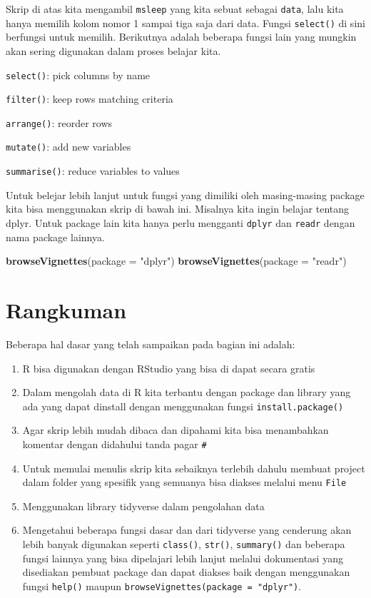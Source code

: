 \documentclass[]{book}
\newenvironment{Shaded}{\begin{snugshade}}{\end{snugshade}}
\newcommand{\DataTypeTok}[1]{\textcolor[rgb]{0.13,0.29,0.53}{#1}}
\newcommand{\KeywordTok}[1]{\textcolor[rgb]{0.13,0.29,0.53}{\textbf{#1}}}
\newcommand{\NormalTok}[1]{#1}
\newcommand{\StringTok}[1]{\textcolor[rgb]{0.31,0.60,0.02}{#1}}
\providecommand{\tightlist}{%
  \setlength{\itemsep}{0pt}\setlength{\parskip}{0pt}}
\begin{document}
Skrip di atas kita mengambil \texttt{msleep} yang kita sebuat sebagai
\texttt{data}, lalu kita hanya memilih kolom nomor 1 sampai tiga saja
dari data. Fungsi \texttt{select()} di sini berfungsi untuk memilih.
Berikutnya adalah beberapa fungsi lain yang mungkin akan sering
digunakan dalam proses belajar kita.

\texttt{select()}: pick columns by name

\texttt{filter()}: keep rows matching criteria

\texttt{arrange()}: reorder rows

\texttt{mutate()}: add new variables

\texttt{summarise()}: reduce variables to values

Untuk belejar lebih lanjut untuk fungsi yang dimiliki oleh masing-masing
package kita bisa menggunakan skrip di bawah ini. Misalnya kita ingin
belajar tentang dplyr. Untuk package lain kita hanya perlu mengganti
\texttt{dplyr} dan \texttt{readr} dengan nama package lainnya.

\begin{Shaded}
\begin{Highlighting}[]
\KeywordTok{browseVignettes}\NormalTok{(}\DataTypeTok{package =} \StringTok{"dplyr"}\NormalTok{)}
\KeywordTok{browseVignettes}\NormalTok{(}\DataTypeTok{package =} \StringTok{"readr"}\NormalTok{)}
\end{Highlighting}
\end{Shaded}

\hypertarget{rangkuman}{%
\section{Rangkuman}\label{rangkuman}}

Beberapa hal dasar yang telah sampaikan pada bagian ini adalah:

\begin{enumerate}
\def\labelenumi{\arabic{enumi}.}
\tightlist
\item
  R bisa digunakan dengan RStudio yang bisa di dapat secara gratis
\item
  Dalam mengolah data di R kita terbantu dengan package dan library yang
  ada yang dapat dinstall dengan menggunakan fungsi
  \texttt{install.package()}
\item
  Agar skrip lebih mudah dibaca dan dipahami kita bisa menambahkan
  komentar dengan didahului tanda pagar \texttt{\#}
\item
  Untuk memulai menulis skrip kita sebaiknya terlebih dahulu membuat
  project dalam folder yang spesifik yang semuanya bisa diakses melalui
  menu \texttt{File}
\item
  Menggunakan library tidyverse dalam pengolahan data
\item
  Mengetahui beberapa fungsi dasar dan dari tidyverse yang cenderung
  akan lebih banyak digunakan seperti \texttt{class()}, \texttt{str()},
  \texttt{summary()} dan beberapa fungsi lainnya yang bisa dipelajari
  lebih lanjut melalui dokumentasi yang disediakan pembuat package dan
  dapat diakses baik dengan menggunakan fungsi \texttt{help()} maupun
  \texttt{browseVignettes(package\ =\ "dplyr")}.
\end{enumerate}
\end{document}
